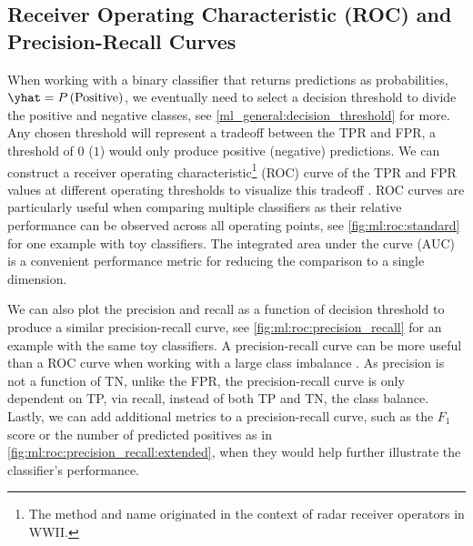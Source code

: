 \subsection{Receiver Operating Characteristic (ROC) and Precision-Recall Curves}
\label{ml_general:eval:ROC}

When working with a binary classifier that returns predictions as probabilities, $\yhat = P\left(\text{Positive}\right)$,
we eventually need to select a decision threshold to divide the positive and negative classes,
see \cref{ml_general:decision_threshold} for more.
Any chosen threshold will represent a tradeoff between the TPR and FPR,
\eg a threshold of $\num{0}$ ($\num{1}$) would only produce positive (negative) predictions.
We can construct a receiver operating characteristic\footnote{The method and name originated in the context of radar receiver operators in WWII.} (ROC) curve
of the TPR and FPR values at different operating thresholds to visualize this tradeoff \cite{Fawcett2006861}.
ROC curves are particularly useful when comparing multiple classifiers
as their relative performance can be observed across all operating points,
see \cref{fig:ml:roc:standard} for one example with toy classifiers.
The integrated area under the curve (AUC) is a convenient performance metric for reducing the comparison to a single dimension.

We can also plot the precision and recall as a function of decision threshold to produce a similar precision-recall curve,
see \cref{fig:ml:roc:precision_recall} for an example with the same toy classifiers.
A precision-recall curve can be more useful than a ROC curve when working with a large class imbalance \cite{10.1371/journal.pone.0118432}.
As precision is not a function of TN, unlike the FPR, the precision-recall curve is only dependent on TP, via recall,
instead of both TP and TN, \ie the class balance.
Lastly, we can add additional metrics to a precision-recall curve,
such as the $F_{1}$ score or the number of predicted positives as in \cref{fig:ml:roc:precision_recall:extended},
when they would help further illustrate the classifier's performance.

